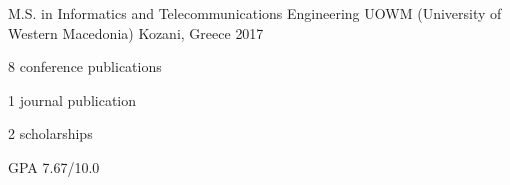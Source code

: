 


\begin{cventries}


\cventry
{M.S. in Informatics and Telecommunications Engineering} %
{UOWM (University of Western Macedonia)} %
{Kozani, Greece} %
{2017} %
{ %
\begin{cvitems}
\item {8 conference publications}
\item {1 journal publication}
\item {2 scholarships}
\item {GPA 7.67/10.0}
\end{cvitems}
}


\end{cventries}